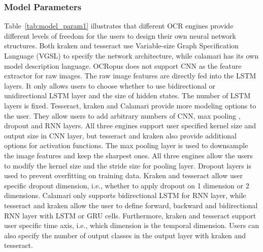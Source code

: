 \documentclass[sigconf]{acmart}
\begin{document}
\subsubsection{Model Parameters}
Table~\ref{tab:model_param1} illustrates that different OCR engines provide
different levels of freedom for the users to design their own neural network
structures. Both kraken and tesseract use Variable-size Graph Specification Language (VGSL) to specify the network architecture, while calamari has its own model description language. OCRopus does not support CNN as the feature extractor for raw
images. The raw image features are directly fed into the LSTM layers. It only
allows users to choose whether to use bidirectional or unidirectional LSTM
layer and the size of hidden states. The number of LSTM layers is fixed.
Tesseract, kraken and Calamari provide more modeling options to the user. They
allow users to add arbitrary numbers of CNN, max pooling \cite{boureau2010theoretical}, dropout \cite{srivastava2014dropout} and RNN
layers. All three engines support user specified kernel size and output size in
CNN layer, but tesseract and kraken also provide additional options for
activation functions. The max pooling layer is used to downsample the image features and keep the sharpest ones. All three engines allow the users to modify the kernel size and the stride size for pooling layer. Dropout layers is used to prevent overfitting on training data. Kraken and tesseract allow user specific dropout dimension, i.e., whether to apply dropout on 1 dimension or 2 dimensions. Calamari only supports bidirectional LSTM for RNN layer, while tesseract and kraken allow the user to define forward, backward and bidirectional RNN layer with LSTM or GRU cells. Furthermore, kraken and tesseract support user specific time axis, i.e., which dimension is the temporal dimension. Users can also specify the number of output classes in the output layer with kraken and tesseract. 
\end{document}
